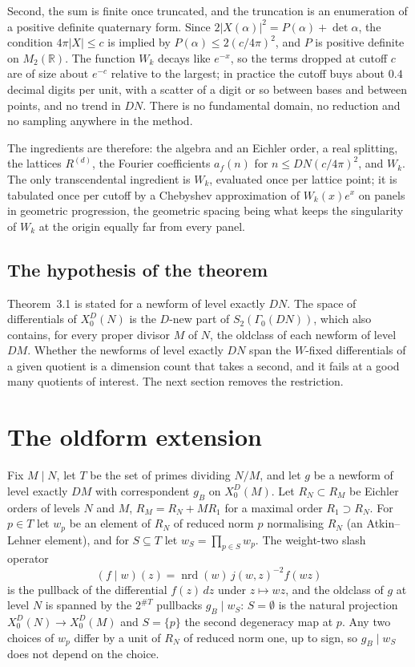 \documentclass[11pt,reqno]{amsart}
\theoremstyle{plain}
\theoremstyle{definition}
\DeclareMathOperator{\nrd}{nrd}
\newcommand{\R}{\mathbb{R}}
\begin{document}
Second, the sum is finite once truncated, and the truncation is an enumeration of a positive
definite quaternary form. Since $2\lvert X(\alpha)\rvert^2=P(\alpha)+\det\alpha$, the condition
$4\pi\lvert X\rvert\le c$ is implied by $P(\alpha)\le 2(c/4\pi)^2$, and $P$ is positive definite
on $M_2(\R)$. The function $W_k$ decays like $e^{-x}$, so the terms dropped at cutoff $c$ are of
size about $e^{-c}$ relative to the largest; in practice the cutoff buys about $0.4$ decimal
digits per unit, with a scatter of a digit or so between bases and between points, and no trend
in $DN$. There is no fundamental domain, no reduction and no sampling anywhere in the method.

The ingredients are therefore: the algebra and an Eichler order, a real splitting, the lattices
$R^{(d)}$, the Fourier coefficients $a_f(n)$ for $n\le DN(c/4\pi)^2$, and $W_k$. The only
transcendental ingredient is $W_k$, evaluated once per lattice point; it is tabulated once per
cutoff by a Chebyshev approximation of $W_k(x)e^x$ on panels in geometric progression, the
geometric spacing being what keeps the singularity of $W_k$ at the origin equally far from every
panel.

\subsection*{The hypothesis of the theorem}
Theorem~3.1 is stated for a newform of level exactly $DN$. The space of differentials of
$X_0^D(N)$ is the $D$-new part of $S_2(\Gamma_0(DN))$, which also contains, for every proper
divisor $M$ of $N$, the oldclass of each newform of level $DM$. Whether the newforms of level
exactly $DN$ span the $W$-fixed differentials of a given quotient is a dimension count that takes
a second, and it fails at a good many quotients of interest. The next section removes the
restriction.

\section{The oldform extension}

Fix $M\mid N$, let $T$ be the set of primes dividing $N/M$, and let $g$ be a newform of level
exactly $DM$ with correspondent $g_B$ on $X_0^D(M)$. Let $R_N\subset R_M$ be Eichler orders of
levels $N$ and $M$, $R_M=R_N+M R_1$ for a maximal order $R_1\supset R_N$. For $p\in T$ let $w_p$
be an element of $R_N$ of reduced norm $p$ normalising $R_N$ (an Atkin--Lehner element), and for
$S\subseteq T$ let $w_S=\prod_{p\in S}w_p$. The weight-two slash operator
\[
(f\mid w)(z)=\nrd(w)\,j(w,z)^{-2}f(wz)
\]
is the pullback of the differential $f(z)\,dz$ under $z\mapsto wz$, and the oldclass of $g$ at
level $N$ is spanned by the $2^{\#T}$ pullbacks $g_B\mid w_S$: $S=\emptyset$ is the natural
projection $X_0^D(N)\to X_0^D(M)$ and $S=\{p\}$ the second degeneracy map at $p$. Any two choices
of $w_p$ differ by a unit of $R_N$ of reduced norm one, up to sign, so $g_B\mid w_S$ does not
depend on the choice.
\end{document}
